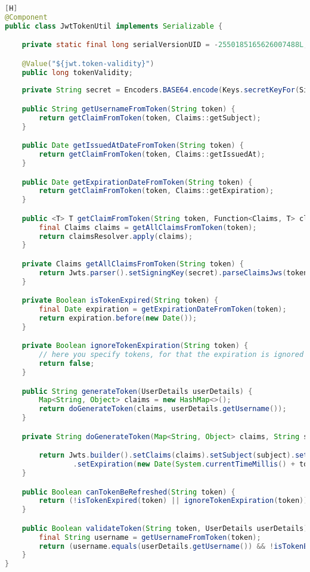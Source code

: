 \begin{lstlisting}[language=JAVA,caption=JwtTokenUtil.java][H]
@Component
public class JwtTokenUtil implements Serializable {

    private static final long serialVersionUID = -2550185165626007488L;

    @Value("${jwt.token-validity}")
    public long tokenValidity;
    
    private String secret = Encoders.BASE64.encode(Keys.secretKeyFor(SignatureAlgorithm.HS512).getEncoded());

    public String getUsernameFromToken(String token) {
        return getClaimFromToken(token, Claims::getSubject);
    }

    public Date getIssuedAtDateFromToken(String token) {
        return getClaimFromToken(token, Claims::getIssuedAt);
    }

    public Date getExpirationDateFromToken(String token) {
        return getClaimFromToken(token, Claims::getExpiration);
    }

    public <T> T getClaimFromToken(String token, Function<Claims, T> claimsResolver) {
        final Claims claims = getAllClaimsFromToken(token);
        return claimsResolver.apply(claims);
    }

    private Claims getAllClaimsFromToken(String token) {
        return Jwts.parser().setSigningKey(secret).parseClaimsJws(token).getBody();
    }

    private Boolean isTokenExpired(String token) {
        final Date expiration = getExpirationDateFromToken(token);
        return expiration.before(new Date());
    }

    private Boolean ignoreTokenExpiration(String token) {
        // here you specify tokens, for that the expiration is ignored
        return false;
    }

    public String generateToken(UserDetails userDetails) {
        Map<String, Object> claims = new HashMap<>();
        return doGenerateToken(claims, userDetails.getUsername());
    }

    private String doGenerateToken(Map<String, Object> claims, String subject) {

        return Jwts.builder().setClaims(claims).setSubject(subject).setIssuedAt(new Date(System.currentTimeMillis()))
                .setExpiration(new Date(System.currentTimeMillis() + tokenValidity * 1000)).signWith(SignatureAlgorithm.HS512, secret).compact();
    }

    public Boolean canTokenBeRefreshed(String token) {
        return (!isTokenExpired(token) || ignoreTokenExpiration(token));
    }

    public Boolean validateToken(String token, UserDetails userDetails) {
        final String username = getUsernameFromToken(token);
        return (username.equals(userDetails.getUsername()) && !isTokenExpired(token));
    }
}
\end{lstlisting}

